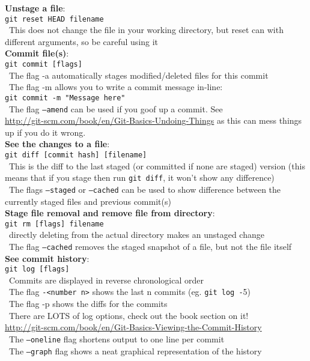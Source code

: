 \documentclass[12pt]{article}
\begin{document}
{{\bf Unstage a file}:\\
\texttt{git reset HEAD filename}\\
\textbullet\, This does not change the file in your working directory, but reset can with different arguments, so be careful using it\\

{\bf Commit file(s)}:\\
\texttt{git commit [flags]}\\
\textbullet\, The flag -a automatically stages modified/deleted files for this commit\\
\textbullet\, The flag -m allows you to write a commit message in-line:\\
 \hspace*{6mm}\texttt{git commit -m "Message here"}\\
\textbullet\, The flag \texttt{--amend} can be used if you goof up a commit. See\\ \url{http://git-scm.com/book/en/Git-Basics-Undoing-Things} as this can mess things up if you do it wrong.\\

{\bf See the changes to a file}:\\
\texttt{git diff [commit hash] [filename]}\\
\textbullet\, This is the diff to the last staged (or committed if none are staged) version (this means that if you stage then run \texttt{git diff}, it won't show any difference)\\
\textbullet\, The flags \texttt{--staged} or \texttt{--cached} can be used to show difference between the currently staged files and previous commit(s)\\

{\bf Stage file removal and remove file from directory}:\\
\texttt{git rm [flags] filename}\\
\textbullet\, directly deleting from the actual directory makes an unstaged change\\
\textbullet\, The flag \texttt{--cached} removes the staged snapshot of a file, but not the file itself\\

{\bf See commit history}:\\
\texttt{git log [flags]}\\
\textbullet\, Commits are displayed in reverse chronological order\\
\textbullet\, The flag \texttt{-<number n>} shows the last n commits (eg. \texttt{git log -}5)\\
\textbullet\, The flag -p shows the diffs for the commits\\
\textbullet\, There are LOTS of log options, check out the book section on it!\\ \url{http://git-scm.com/book/en/Git-Basics-Viewing-the-Commit-History}\\
\textbullet\, The \texttt{--oneline} flag shortens output to one line per commit\\
\textbullet\, The \texttt{--graph} flag shows a neat graphical representation of the history\\

}
\end{document}
